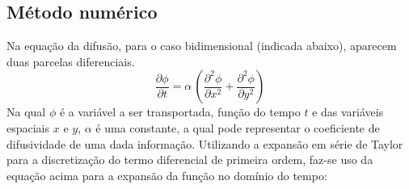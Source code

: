 \documentclass[a0,portrait]{a0poster}
\newtheorem{proposition}[theorem]{Proposição}
\begin{document}
\begin{minipage}[c]{\linewidth}
\begin{framed}
\begin{multicols}{2}
\section*{Método numérico}
%
Na equação da difusão, para o caso bidimensional (indicada abaixo), aparecem duas parcelas diferenciais. 
\begin{equation} \label{difusao_pura}
\frac{\partial \phi}{\partial t} = \alpha \,\left( \frac{\partial^{2} \phi}{\partial x^{2}} + \frac{\partial^{2} \phi}{\partial y^{2}} \right) 
\end{equation}
Na qual $\phi$ é a variável a ser transportada, função do tempo $t$ e das variáveis espaciais $x$ e $y$, $\alpha$ é uma constante, a qual pode representar o coeficiente de difusividade de uma dada informação.
Utilizando a expansão em série de Taylor para a discretização do termo diferencial de primeira ordem, faz-se uso da equação acima para a expansão da função no domínio do tempo:


\end{multicols}
\end{framed}
\end{minipage}
\end{document}
